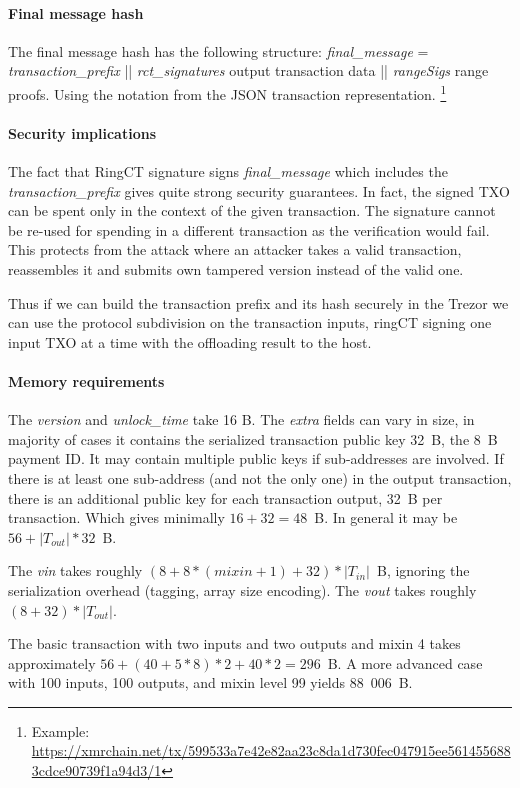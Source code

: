 \documentclass[]{article}
\begin{document}
\paragraph{Final message hash} The final message hash has the following structure: \emph{final\_message} = \emph{transaction\_prefix} || \emph{rct\_signatures} output transaction data || \emph{rangeSigs} range proofs. Using the notation from the JSON transaction representation. \footnote{Example: \url{https://xmrchain.net/tx/599533a7e42e82aa23c8da1d730fec047915ee5614556883cdce90739f1a94d3/1}}

\paragraph{Security implications}
The fact that RingCT signature signs \emph{final\_message} which includes the \emph{transaction\_prefix} gives quite strong security guarantees. In fact, the signed TXO can be spent only in the context of the given transaction. The signature cannot be re-used for spending in a different transaction as the verification would fail. This protects from the attack where an attacker takes a valid transaction, reassembles it and submits own tampered version instead of the valid one.

Thus if we can build the transaction prefix and its hash securely in the Trezor we can use the protocol subdivision on the transaction inputs, ringCT signing one input TXO at a time with the offloading result to the host. 

\paragraph{Memory requirements}
The \emph{version} and \emph{unlock\_time} take 16 B. The \emph{extra} fields can vary in size, in majority of cases it contains the serialized transaction public key 32~B, the 8~B payment ID. It may contain multiple public keys if sub-addresses are involved. If there is at least one sub-address (and not the only one) in the output transaction, there is an additional public key for each transaction output, 32~B per transaction. Which gives minimally $16 + 32 = 48$~B. In general it may be $56 + \left|T_{out}\right| * 32$~B.

The \emph{vin} takes roughly $(8 + 8 * (mixin + 1) + 32) * \left|T_{in}\right|$~B, ignoring the serialization overhead (tagging, array size encoding). The \emph{vout} takes roughly $(8 + 32) * \left|T_{out}\right|$.

The basic transaction with two inputs and two outputs and mixin 4 takes approximately $56 + (40 + 5*8)*2 + 40*2 = 296$~B. A more advanced case with 100 inputs, 100 outputs, and mixin level 99 yields 88~006~B.  
\end{document}
